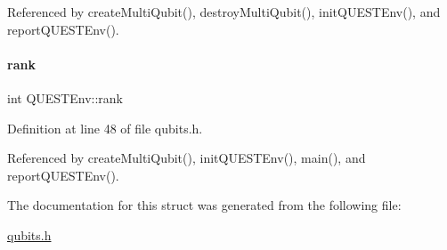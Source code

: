 Referenced by create\+Multi\+Qubit(), destroy\+Multi\+Qubit(), init\+Q\+U\+E\+S\+T\+Env(), and report\+Q\+U\+E\+S\+T\+Env().

\mbox{\label{structQUESTEnv_a1bdb6d425a2ce6a468f93929c0b26d73}} 
\paragraph{\texorpdfstring{rank}{rank}}
{\footnotesize\ttfamily int Q\+U\+E\+S\+T\+Env\+::rank}



Definition at line 48 of file qubits.\+h.



Referenced by create\+Multi\+Qubit(), init\+Q\+U\+E\+S\+T\+Env(), main(), and report\+Q\+U\+E\+S\+T\+Env().



The documentation for this struct was generated from the following file\+:\begin{DoxyCompactItemize}
\item 
\hyperlink{qubits_8h}{qubits.\+h}\end{DoxyCompactItemize}
